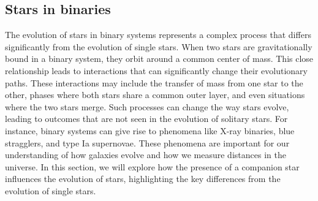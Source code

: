 \documentclass[main.tex]{subfiles}
\begin{document}
    \subsection{Stars in binaries}\label{sec:ch1:binaries}
    The evolution of stars in binary systems represents a complex process that differs significantly from the evolution of single stars. When two stars are gravitationally bound in a binary system, they orbit around a common center of mass. This close relationship leads to interactions that can significantly change their evolutionary paths. These interactions may include the transfer of mass from one star to the other, phases where both stars share a common outer layer, and even situations where the two stars merge. Such processes can change the way stars evolve, leading to outcomes that are not seen in the evolution of solitary stars. For instance, binary systems can give rise to phenomena like X-ray binaries, blue stragglers, and type Ia supernovae. These phenomena are important for our understanding of how galaxies evolve and how we measure distances in the universe. In this section, we will explore how the presence of a companion star influences the evolution of stars, highlighting the key differences from the evolution of single stars.
\end{document}
